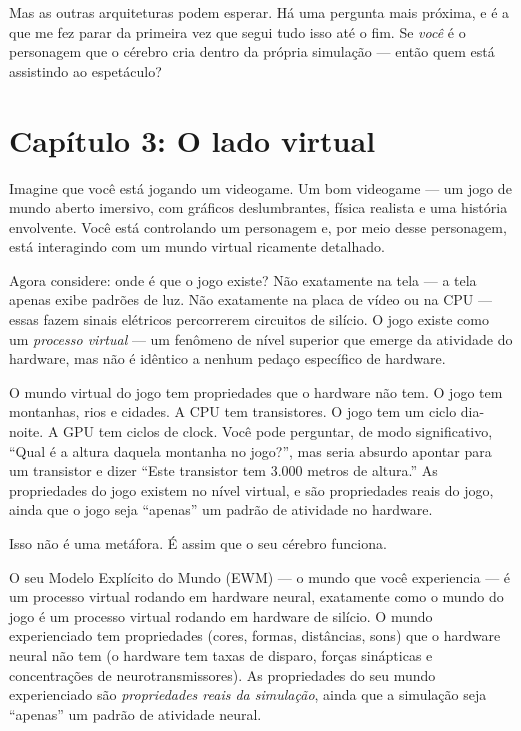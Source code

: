 \documentclass[11pt, twoside, openright]{book}
\begin{document}
Mas as outras arquiteturas podem esperar. Há uma pergunta mais próxima, e é a que me fez parar da primeira vez que segui tudo isso até o fim. Se \textit{você} é o personagem que o cérebro cria dentro da própria simulação --- então quem está assistindo ao espetáculo?


\chapter*{Capítulo 3: O lado virtual}

Imagine que você está jogando um videogame. Um bom videogame --- um jogo de mundo aberto imersivo, com gráficos deslumbrantes, física realista e uma história envolvente. Você está controlando um personagem e, por meio desse personagem, está interagindo com um mundo virtual ricamente detalhado.

Agora considere: onde é que o jogo existe? Não exatamente na tela --- a tela apenas exibe padrões de luz. Não exatamente na placa de vídeo ou na CPU --- essas fazem sinais elétricos percorrerem circuitos de silício. O jogo existe como um \textit{processo virtual} --- um fenômeno de nível superior que emerge da atividade do hardware, mas não é idêntico a nenhum pedaço específico de hardware.

O mundo virtual do jogo tem propriedades que o hardware não tem. O jogo tem montanhas, rios e cidades. A CPU tem transistores. O jogo tem um ciclo dia-noite. A GPU tem ciclos de clock. Você pode perguntar, de modo significativo, ``Qual é a altura daquela montanha no jogo?'', mas seria absurdo apontar para um transistor e dizer ``Este transistor tem 3.000 metros de altura.'' As propriedades do jogo existem no nível virtual, e são propriedades reais do jogo, ainda que o jogo seja ``apenas'' um padrão de atividade no hardware.

Isso não é uma metáfora. É assim que o seu cérebro funciona.

O seu Modelo Explícito do Mundo (EWM) --- o mundo que você experiencia --- é um processo virtual rodando em hardware neural, exatamente como o mundo do jogo é um processo virtual rodando em hardware de silício. O mundo experienciado tem propriedades (cores, formas, distâncias, sons) que o hardware neural não tem (o hardware tem taxas de disparo, forças sinápticas e concentrações de neurotransmissores). As propriedades do seu mundo experienciado são \textit{propriedades reais da simulação}, ainda que a simulação seja ``apenas'' um padrão de atividade neural.
\end{document}
